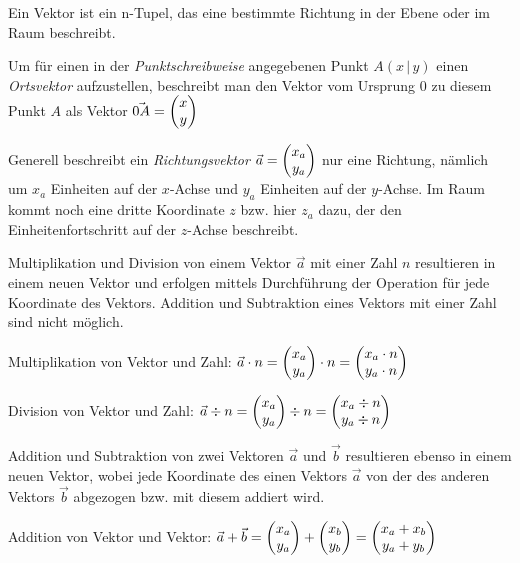 



\thispagestyle{plain}

Ein Vektor ist ein n-Tupel, das eine bestimmte Richtung in der Ebene oder im Raum beschreibt.


Um f\"{u}r einen in der \emph{Punktschreibweise} angegebenen Punkt $A (x\, |\, y)$ einen \emph{Ortsvektor} aufzustellen, beschreibt man den Vektor vom Ursprung $0$ zu diesem Punkt $A$ als Vektor $\vec{0A} = \begin{pmatrix}x\\y\end{pmatrix}$

Generell beschreibt ein \emph{Richtungsvektor} $\vec{a} = \begin{pmatrix}x_{a} \\ y_{a}\end{pmatrix}$ nur eine Richtung, n\"{a}mlich um $x_{a}$ Einheiten auf der $x$-Achse und $y_{a}$ Einheiten auf der $y$-Achse. Im Raum kommt noch eine dritte Koordinate $z$ bzw. hier $z_{a}$ dazu, der den Einheitenfortschritt auf der $z$-Achse beschreibt.



Multiplikation und Division von einem Vektor $\vec{a}$ mit einer Zahl $n$ resultieren in einem neuen Vektor und erfolgen mittels Durchf\"{u}hrung der Operation f\"{u}r jede Koordinate des Vektors. Addition und Subtraktion eines Vektors mit einer Zahl sind nicht m\"{o}glich.

Multiplikation von Vektor und Zahl: $ \vec{a} \cdot n = \begin{pmatrix}x_{a}\\y_{a}\end{pmatrix} \cdot n  = \begin{pmatrix}x_{a} \cdot n \\ y_{a} \cdot n\end{pmatrix}$

Division von Vektor und Zahl: $ \vec{a} \div n = \begin{pmatrix}x_{a}\\y_{a}\end{pmatrix} \div n = \begin{pmatrix}x_{a} \div n \\ y_{a} \div n\end{pmatrix}$


Addition und Subtraktion von zwei Vektoren $\vec{a}$ und $\vec{b}$ resultieren ebenso in einem neuen Vektor, wobei jede Koordinate des einen Vektors $\vec{a}$ von der des anderen Vektors $\vec{b}$ abgezogen bzw. mit diesem addiert wird.

Addition von Vektor und Vektor: $\vec{a} + \vec{b} = \begin{pmatrix}x_{a}\\y_{a}\end{pmatrix} + \begin{pmatrix}x_{b}\\y_{b}\end{pmatrix} = \begin{pmatrix}x_{a} + x_{b} \\ y_{a} + y_{b}\end{pmatrix}$

